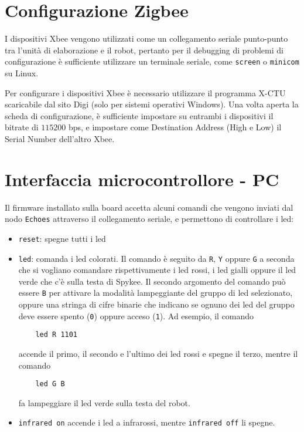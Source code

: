 \section{Configurazione Zigbee} I dispositivi Xbee vengono utilizzati come un collegamento seriale punto-punto tra l'unità di elaborazione e il robot, pertanto per il debugging di problemi di configurazione è sufficiente utilizzare un terminale seriale, come \verb|screen| o \verb|minicom| su Linux. 

Per configurare i dispositivi Xbee è necessario utilizzare il programma X-CTU scaricabile dal sito Digi (solo per sistemi operativi Windows). Una volta aperta la scheda di configurazione, è sufficiente impostare su entrambi i dispositivi il bitrate di $115200$ bps, e impostare come Destination Address (High e Low) il Serial Number dell'altro Xbee.

\section{Interfaccia microcontrollore - PC}
Il firmware installato sulla board accetta alcuni comandi che vengono inviati dal nodo \verb|Echoes| attraverso il collegamento seriale, e permettono di controllare i led:
\begin{itemize}
\item \verb|reset|: spegne tutti i led
\item \verb|led|: comanda i led colorati. Il comando è seguito da \verb|R|, \verb|Y| oppure \verb|G| a seconda che si vogliano comandare rispettivamente i led rossi, i led gialli oppure il led verde che c'è sulla testa di Spykee. Il secondo argomento del comando può essere \verb|B| per attivare la modalità lampeggiante del gruppo di led selezionato, oppure una stringa di cifre binarie che indicano se ognuno dei led del gruppo deve essere spento (\verb|0|) oppure acceso (\verb|1|). Ad esempio, il comando
\begin{verbatim}
    led R 1101
\end{verbatim}
accende il primo, il secondo e l'ultimo dei led rossi e spegne il terzo, mentre il comando
\begin{verbatim}
    led G B
\end{verbatim}
fa lampeggiare il led verde sulla testa del robot.
\item \verb|infrared on| accende i led a infrarossi, mentre \verb|infrared off| li spegne.
\end{itemize}

